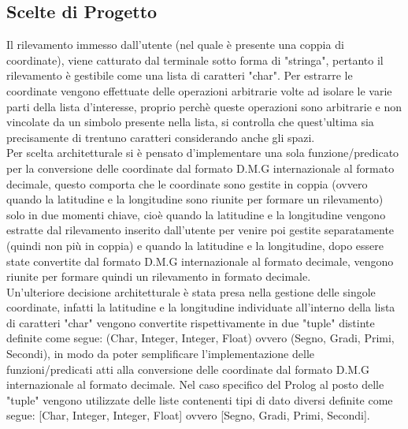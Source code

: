 \documentclass{article}
\begin{document}
\subsection{Scelte di Progetto}
Il rilevamento immesso dall'utente (nel quale è presente una coppia di coordinate), viene catturato dal terminale sotto forma di "stringa", pertanto il rilevamento è gestibile come una lista di caratteri "char". Per estrarre le coordinate vengono effettuate delle operazioni arbitrarie volte ad isolare le varie parti della lista d'interesse, proprio perchè queste operazioni sono arbitrarie e non vincolate da un simbolo presente nella lista, si controlla che quest'ultima sia precisamente di trentuno caratteri considerando anche gli spazi.\\
Per scelta architetturale si è pensato d'implementare una sola funzione/predicato per la conversione delle coordinate dal formato D.M.G internazionale al formato decimale, questo comporta che le coordinate sono gestite in coppia (ovvero quando la latitudine e la longitudine sono riunite per formare un rilevamento) solo in due momenti chiave, cioè quando la latitudine e la longitudine vengono estratte dal rilevamento inserito dall'utente per venire poi gestite separatamente (quindi non più in coppia) e quando la latitudine e la longitudine, dopo essere state convertite dal formato D.M.G internazionale al formato decimale, vengono riunite per formare quindi un rilevamento in formato decimale.\\
 Un'ulteriore decisione architetturale è stata presa nella gestione delle singole coordinate, infatti la latitudine e la longitudine individuate all'interno della lista di caratteri "char" vengono convertite rispettivamente in due "tuple" distinte definite come segue: (Char, Integer, Integer, Float) ovvero (Segno, Gradi, Primi, Secondi), in modo da poter semplificare l'implementazione delle funzioni/predicati atti alla conversione delle coordinate dal formato D.M.G internazionale al formato decimale. Nel caso specifico del Prolog al posto delle "tuple" vengono utilizzate delle liste contenenti tipi di dato diversi definite come segue: [Char, Integer, Integer, Float] ovvero [Segno, Gradi, Primi, Secondi].
 
\end{document}
